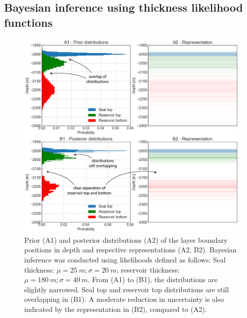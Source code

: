 
			\subsection{Bayesian inference using thickness likelihood functions}	
			\begin{figure}[p!]
				\centering
				\includegraphics[width=1\textwidth]{Figures/update_moderate1.png}
				\caption{Prior (A1) and posterior distributions (A2) of the layer boundary positions in depth and respective representations (A2, B2). Bayesian inference was conducted using likelihoods defined as follows: Seal thickness: $\mu = 25~m; \sigma = 20~m$; reservoir thickness: $\mu = 180~m; \sigma = 40~m$. From (A1) to (B1), the distributions are slightly narrowed. Seal top and reservoir top distributions are still overlapping in (B1). A moderate reduction in uncertainty is also indicated by the representation in (B2), compared to (A2).}\label{fig:update_moderate1} 
			\end{figure}

